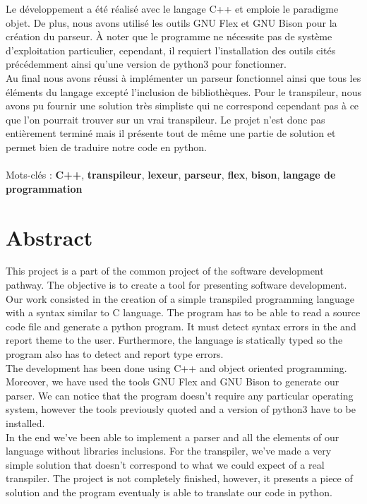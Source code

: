 \documentclass[a4paper]{article}%
\begin{document}
Le développement a été réalisé avec le langage C++ et emploie le paradigme objet.
De plus, nous avons utilisé les outils GNU Flex et GNU Bison pour la création du
parseur. À noter que le programme ne nécessite pas de système d'exploitation
particulier, cependant, il requiert l'installation des outils cités précédemment
ainsi qu'une version de python3 pour fonctionner.\\ %

Au final nous avons réussi à implémenter un parseur fonctionnel ainsi que tous
les éléments du langage excepté l'inclusion de bibliothèques. Pour le
transpileur, nous avons pu fournir une solution très simpliste qui ne correspond
cependant pas à ce que l'on pourrait trouver sur un vrai transpileur. Le projet
n'est donc pas entièrement terminé mais il présente tout de même une partie de
solution et permet bien de traduire notre code en python.
\\~\\

\noindent
Mots-clés : \textbf{C++}, \textbf{transpileur}, \textbf{lexeur}, \textbf{parseur},
\textbf{flex}, \textbf{bison},  \textbf{langage de programmation}

\section*{Abstract}

This project is a part of the common project of the software development
pathway. The objective is to create a tool for presenting software development.
Our work consisted in the creation of a simple transpiled programming language
with a syntax similar to C language. The program has to be able to read a source
code file and generate a python program. It must detect syntax errors in the and
report theme to the user. Furthermore, the language is statically typed so the
program also has to detect and report type errors.\\

The development has been done using C++ and object oriented programming.
Moreover, we have used the tools GNU Flex and GNU Bison to generate our parser.
We can notice that the program doesn't require any particular operating system,
however the tools previously quoted and a version of python3 have to be
installed.\\

In the end we've been able to implement a parser and all the elements of our
language without libraries inclusions. For the transpiler, we've made a very
simple solution that doesn't correspond to what we could expect of a real
transpiler. The project is not completely finished, however, it presents a piece
of solution and the program eventualy is able to translate our code in python.
\\~\\
\end{document}
